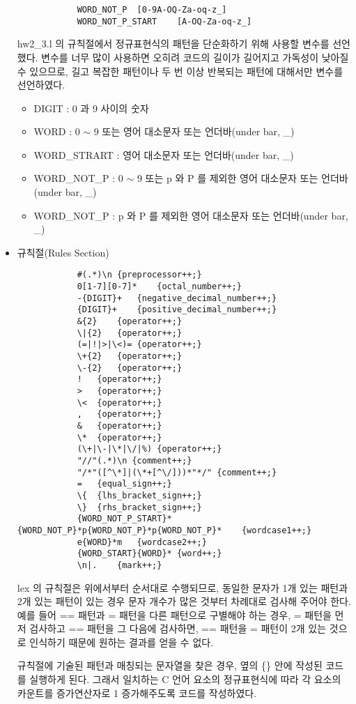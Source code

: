 \documentclass{article}
\begin{document}
\begin{itemize}
\begin{lstlisting}
			WORD_NOT_P	[0-9A-OQ-Za-oq-z_]
			WORD_NOT_P_START	[A-OQ-Za-oq-z_]
		\end{lstlisting}
		hw2\_3.l 의 규칙절에서 정규표현식의 패턴을 단순화하기 위해 사용할 변수를 선언했다.
		변수를 너무 많이 사용하면 오히려 코드의 길이가 길어지고 가독성이 낮아질 수 있으므로,
		길고 복잡한 패턴이나 두 번 이상 반복되는 패턴에 대해서만 변수를 선언하였다.
		\begin{itemize}
			\item DIGIT : 0 과 9 사이의 숫자
			\item WORD : 0 $\sim$ 9 또는 영어 대소문자 또는 언더바(under bar, \_)
			\item WORD\_STRART : 영어 대소문자 또는 언더바(under bar, \_)
			\item WORD\_NOT\_P : 0 $\sim$ 9 또는 p 와 P 를 제외한 영어 대소문자 또는 언더바(under bar, \_)
			\item WORD\_NOT\_P : p 와 P 를 제외한 영어 대소문자 또는 언더바(under bar, \_)
		\end{itemize}
	\item 규칙절(Rules Section)	
		\begin{lstlisting}
			#(.*)\n	{preprocessor++;}
			0[1-7][0-7]*	{octal_number++;}
			-{DIGIT}+	{negative_decimal_number++;}
			{DIGIT}+	{positive_decimal_number++;}
			&{2}	{operator++;}
			\|{2}	{operator++;}
			(=|!|>|\<)=	{operator++;}
			\+{2}	{operator++;}
			\-{2}	{operator++;}
			!	{operator++;}
			>	{operator++;}
			\<	{operator++;}
			,	{operator++;}
			&	{operator++;}
			\*	{operator++;}
			(\+|\-|\*|\/|%)	{operator++;}
			"//"(.*)\n {comment++;}
			"/*"([^\*]|(\*+[^\/]))*"*/" {comment++;}
			=	{equal_sign++;}
			\{	{lhs_bracket_sign++;}
			\}	{rhs_bracket_sign++;}
			{WORD_NOT_P_START}*{WORD_NOT_P}*p{WORD_NOT_P}*p{WORD_NOT_P}*	{wordcase1++;}
			e{WORD}*m	{wordcase2++;}
			{WORD_START}{WORD}*	{word++;}
			\n|.	{mark++;}
		\end{lstlisting}
		lex 의 규칙절은 위에서부터 순서대로 수행되므로, 동일한 문자가 1개 있는 패턴과 2개
		있는 패턴이 있는 경우 문자 개수가 많은 것부터 차례대로 검사해 주어야 한다. 예를 들어
		== 패턴과 = 패턴을 다른 패턴으로 구별해야 하는 경우, = 패턴을 먼저 검사하고 ==
		패턴을 그 다음에 검사하면, == 패턴을 = 패턴이 2개 있는 것으로 인식하기 때문에 원하는
		결과를 얻을 수 없다.

		규칙절에 기술된 패턴과 매칭되는 문자열을 찾은 경우, 옆의 \{\} 안에 작성된 코드를
		실행하게 된다. 그래서 일치하는 C 언어 요소의 정규표현식에 따라 각 요소의 카운트를
		증가연산자로 1 증가해주도록 코드를 작성하였다.


\end{itemize}
\end{document}
